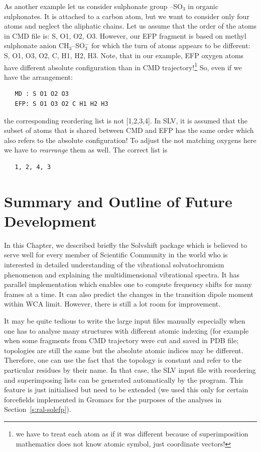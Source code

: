 \documentclass[b5paper,oneside,fleqn,11pt]{book}
\begin{document}
\begin{refsection}
As another example let us consider sulphonate group --SO$_3$
in organic sulphonates. It is attached to a carbon atom, but we want to consider only four atoms
and neglect the aliphatic chains. 
Let us assume that the order of the atoms in CMD file is: 
S, O1, O2, O3. However, our EFP fragment is based on methyl sulphonate anion CH$_3$--SO$_3^-$
for which the turn of atoms appears to be different: S, O1, O3, O2, C, H1, H2, H3. Note, that in our
example, EFP oxygen atoms have different absolute configuration than in CMD trajectory!\footnote{we have to treat
each atom as if it was different because of superimposition mathematics does not know atomic symbol,
just coordinate vectors!} So, even if we have the arrangement:
%
\begin{verbatim}
   MD : S O1 O2 O3
   EFP: S O1 O3 O2 C H1 H2 H3
\end{verbatim}
%
the corresponding reordering list is not [1,2,3,4]. In SLV, it is assumed
that the subset of atoms that is shared between CMD and EFP has the same order which also refers to the
absolute configuration! To adjust the not matching oxygens here we have to \emph{rearrange}
them as well. The correct list is
%
\begin{verbatim}
   1, 2, 4, 3
\end{verbatim}
%


\section{Summary and Outline of Future Development}

In this Chapter, we described briefly the {\sc Solvshift} package
which is believed to serve well for every member of Scientific Community
in the world who is interested in detailed understanding of the
vibrational solvatochromism phenomenon and explaining
the multidimensional vibrational spectra. It has parallel 
implementation which enables one to compute frequency shifts
for many frames at a time. It can also predict the changes in the
transition dipole moment within WCA limit. However, there is still a lot room for improvement.

It may be quite tedious to write the large input files manually especially when one has to analyse many
structures with different atomic indexing (for example when some fragments from CMD trajectory were
cut and saved in PDB file; topologies are still the same but the absolute atomic indices may be different.
Therefore, one can use the fact that the topology is constant and refer to the particular residues by their
name. In that case, the SLV input file with reordering and superimposing lists can be generated
automatically by the program. This feature is just initialised but need to be extended (we used
this only for certain forcefields implemented in {\sc Gromacs} for the purposes
of the analyses in Section~\ref{s:ral-solefp}).


\end{refsection}
\end{document}
